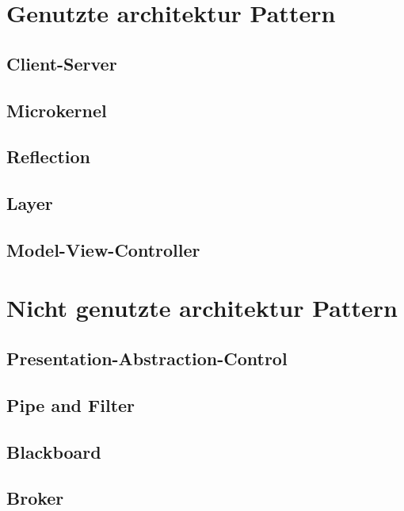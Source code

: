 \section{Genutzte architektur Pattern}
\subsection{Client-Server}

\subsection{Microkernel}

\subsection{Reflection}

\subsection{Layer}

\subsection{Model-View-Controller}

\section{Nicht genutzte architektur Pattern}
\subsection{Presentation-Abstraction-Control}

\subsection{Pipe and Filter}

\subsection{Blackboard}

\subsection{Broker}
